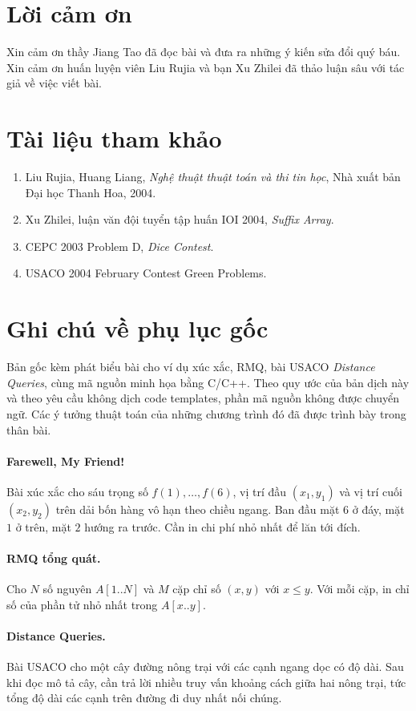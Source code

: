 \documentclass[11pt]{article}
\begin{document}
\section*{Lời cảm ơn}

Xin cảm ơn thầy Jiang Tao đã đọc bài và đưa ra những ý kiến sửa đổi quý báu.
Xin cảm ơn huấn luyện viên Liu Rujia và bạn Xu Zhilei đã thảo luận sâu với
tác giả về việc viết bài.

\section*{Tài liệu tham khảo}

\begin{enumerate}
  \item Liu Rujia, Huang Liang, \textit{Nghệ thuật thuật toán và thi tin học},
  Nhà xuất bản Đại học Thanh Hoa, 2004.
  \item Xu Zhilei, luận văn đội tuyển tập huấn IOI 2004, \textit{Suffix
  Array}.
  \item CEPC 2003 Problem D, \textit{Dice Contest}.
  \item USACO 2004 February Contest Green Problems.
\end{enumerate}

\appendix
\section{Ghi chú về phụ lục gốc}

Bản gốc kèm phát biểu bài cho ví dụ xúc xắc, RMQ, bài USACO \textit{Distance
Queries}, cùng mã nguồn minh họa bằng C/C++. Theo quy ước của bản dịch này và
theo yêu cầu không dịch code templates, phần mã nguồn không được chuyển ngữ.
Các ý tưởng thuật toán của những chương trình đó đã được trình bày trong thân
bài.

\paragraph{Farewell, My Friend!}
Bài xúc xắc cho sáu trọng số $f(1),\ldots,f(6)$, vị trí đầu
$(x_1,y_1)$ và vị trí cuối $(x_2,y_2)$ trên dải bốn hàng vô hạn theo chiều
ngang. Ban đầu mặt $6$ ở đáy, mặt $1$ ở trên, mặt $2$ hướng ra trước. Cần in
chi phí nhỏ nhất để lăn tới đích.

\paragraph{RMQ tổng quát.}
Cho $N$ số nguyên $A[1..N]$ và $M$ cặp chỉ số $(x,y)$ với $x\le y$. Với mỗi
cặp, in chỉ số của phần tử nhỏ nhất trong $A[x..y]$.

\paragraph{Distance Queries.}
Bài USACO cho một cây đường nông trại với các cạnh ngang dọc có độ dài. Sau
khi đọc mô tả cây, cần trả lời nhiều truy vấn khoảng cách giữa hai nông trại,
tức tổng độ dài các cạnh trên đường đi duy nhất nối chúng.
\end{document}
